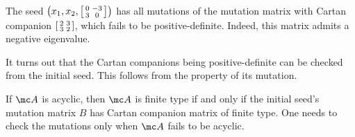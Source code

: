 \documentclass[../notes.tex]{subfiles}
\begin{document}
\begin{nex}
	The seed $\left(x_1,x_2,\begin{bsmallmatrix}
		0 & -3 \\ 3 & 0
	\end{bsmallmatrix}\right)$ has all mutations of the mutation matrix with Cartan companion $\begin{bsmallmatrix}
		2 & 3 \\ 3 & 2
	\end{bsmallmatrix}$, which fails to be positive-definite. Indeed, this matrix admits a negative eigenvalue.
\end{nex}
\begin{remark}
	It turns out that the Cartan companions being positive-definite can be checked from the initial seed. This follows from the property of its mutation.
\end{remark}
\begin{remark}
	If $\mc A$ is acyclic, then $\mc A$ is finite type if and only if the initial seed's mutation matrix $B$ has Cartan companion matrix of finite type. One needs to check the mutations only when $\mc A$ fails to be acyclic.
\end{remark}
\end{document}
